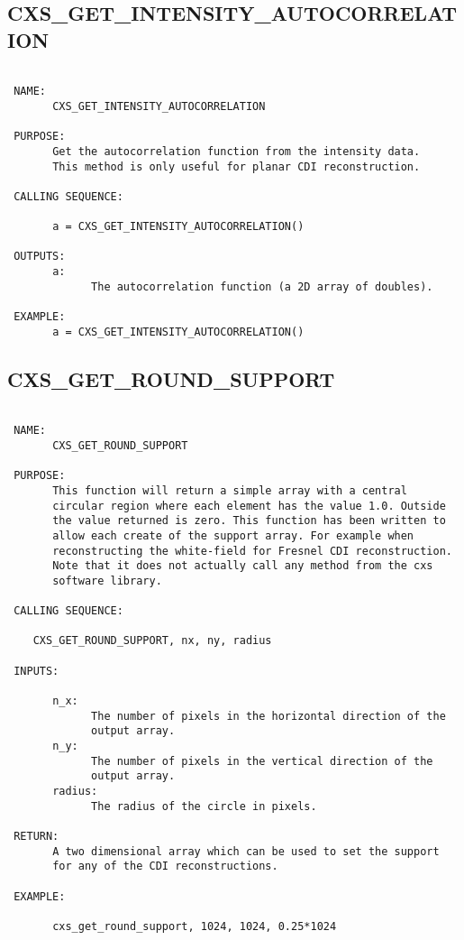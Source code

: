  
\subsection{CXS\_GET\_INTENSITY\_AUTOCORRELATION}
\begin{verbatim}

 NAME:
       CXS_GET_INTENSITY_AUTOCORRELATION

 PURPOSE:
       Get the autocorrelation function from the intensity data.
       This method is only useful for planar CDI reconstruction.

 CALLING SEQUENCE:

       a = CXS_GET_INTENSITY_AUTOCORRELATION()

 OUTPUTS:
       a:
             The autocorrelation function (a 2D array of doubles).

 EXAMPLE:
       a = CXS_GET_INTENSITY_AUTOCORRELATION()

\end{verbatim}

\subsection{CXS\_GET\_ROUND\_SUPPORT}
\begin{verbatim}

 NAME:
       CXS_GET_ROUND_SUPPORT

 PURPOSE: 
       This function will return a simple array with a central
       circular region where each element has the value 1.0. Outside
       the value returned is zero. This function has been written to
       allow each create of the support array. For example when
       reconstructing the white-field for Fresnel CDI reconstruction.
       Note that it does not actually call any method from the cxs
       software library.

 CALLING SEQUENCE:

	CXS_GET_ROUND_SUPPORT, nx, ny, radius

 INPUTS:

       n_x: 
             The number of pixels in the horizontal direction of the
             output array.
       n_y: 
             The number of pixels in the vertical direction of the
             output array.
       radius: 
             The radius of the circle in pixels.

 RETURN:
       A two dimensional array which can be used to set the support
       for any of the CDI reconstructions.

 EXAMPLE:

       cxs_get_round_support, 1024, 1024, 0.25*1024

\end{verbatim}

